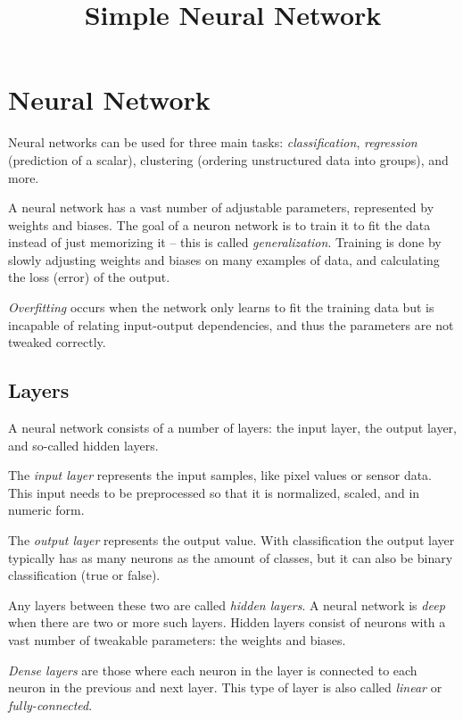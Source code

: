 \documentclass[a4paper]{article}
\title{\vspace{-1in}Simple Neural Network}
\author{}
\date{}
\begin{document}
\maketitle
\vspace{-0.5in}

\section*{Neural Network}
Neural networks can be used for three main tasks: \emph{classification}, \emph{regression} (prediction of a scalar), clustering (ordering unstructured data into groups), and more.

A neural network has a vast number of adjustable parameters, represented by weights and biases. The goal of a neuron network is to train it to fit the data instead of just memorizing it -- this is called \emph{generalization}. Training is done by slowly adjusting weights and biases on many examples of data, and calculating the loss (error) of the output.

\emph{Overfitting} occurs when the network only learns to fit the training data but is incapable of 
relating input-output dependencies, and thus the parameters are not tweaked correctly.

\subsection*{Layers}
A neural network consists of a number of layers: the input layer, the output layer, and so-called hidden layers.

The \emph{input layer} represents the input samples, like pixel values or sensor data. This input needs to be preprocessed so that it is normalized, scaled, and in numeric form.

The \emph{output layer} represents the output value. With classification the output layer typically has as many neurons as the amount of classes, but it can also be binary classification (true or false).

Any layers between these two are called \emph{hidden layers}. A neural network is \emph{deep} when there are two or more such layers. Hidden layers consist of neurons with a vast number of tweakable parameters: the weights and biases. 

\emph{Dense layers} are those where each neuron in the layer is connected to each neuron in the previous and next layer. This type of layer is also called \emph{linear} or \emph{fully-connected}.
\end{document}
